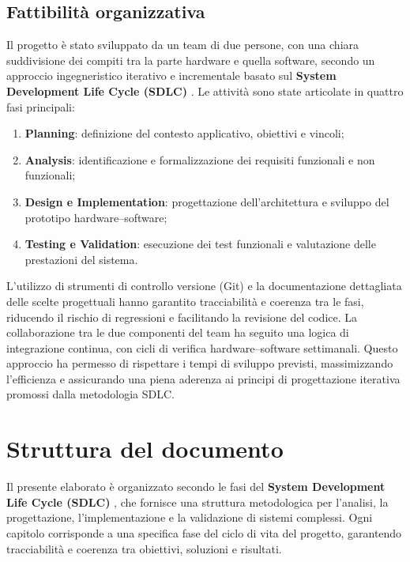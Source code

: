 \subsection{Fattibilità organizzativa}
Il progetto è stato sviluppato da un team di due persone, con una chiara suddivisione dei compiti tra la parte hardware e quella software, secondo un approccio ingegneristico iterativo e incrementale basato sul \textbf{System Development Life Cycle (SDLC)} \cite{Pressman2019}.  
Le attività sono state articolate in quattro fasi principali:
\begin{enumerate}
    \item \textbf{Planning}: definizione del contesto applicativo, obiettivi e vincoli;
    \item \textbf{Analysis}: identificazione e formalizzazione dei requisiti funzionali e non funzionali;
    \item \textbf{Design e Implementation}: progettazione dell’architettura e sviluppo del prototipo hardware–software;
    \item \textbf{Testing e Validation}: esecuzione dei test funzionali e valutazione delle prestazioni del sistema.
\end{enumerate}

L’utilizzo di strumenti di controllo versione (Git) e la documentazione dettagliata delle scelte progettuali hanno garantito tracciabilità e coerenza tra le fasi, riducendo il rischio di regressioni e facilitando la revisione del codice.  
La collaborazione tra le due componenti del team ha seguito una logica di integrazione continua, con cicli di verifica hardware–software settimanali.  
Questo approccio ha permesso di rispettare i tempi di sviluppo previsti, massimizzando l’efficienza e assicurando una piena aderenza ai principi di progettazione iterativa promossi dalla metodologia SDLC.


\section{Struttura del documento}

Il presente elaborato è organizzato secondo le fasi del \textbf{System Development Life Cycle (SDLC)} \cite{Pressman2019}, che fornisce una struttura metodologica per l’analisi,
la progettazione, l’implementazione e la validazione di sistemi complessi.
Ogni capitolo corrisponde a una specifica fase del ciclo di vita del progetto, garantendo tracciabilità e coerenza tra obiettivi, soluzioni e risultati.

